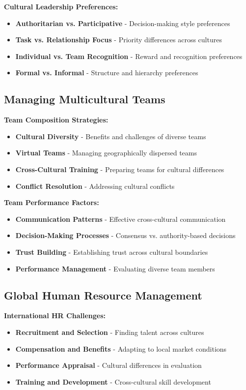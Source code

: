 \documentclass[12pt]{article}
\begin{document}
\textbf{Cultural Leadership Preferences:}
\begin{itemize}
    \item \textbf{Authoritarian vs. Participative} - Decision-making style preferences
    \item \textbf{Task vs. Relationship Focus} - Priority differences across cultures
    \item \textbf{Individual vs. Team Recognition} - Reward and recognition preferences
    \item \textbf{Formal vs. Informal} - Structure and hierarchy preferences
\end{itemize}

\subsection{Managing Multicultural Teams}

\textbf{Team Composition Strategies:}
\begin{itemize}
    \item \textbf{Cultural Diversity} - Benefits and challenges of diverse teams
    \item \textbf{Virtual Teams} - Managing geographically dispersed teams
    \item \textbf{Cross-Cultural Training} - Preparing teams for cultural differences
    \item \textbf{Conflict Resolution} - Addressing cultural conflicts
\end{itemize}

\textbf{Team Performance Factors:}
\begin{itemize}
    \item \textbf{Communication Patterns} - Effective cross-cultural communication
    \item \textbf{Decision-Making Processes} - Consensus vs. authority-based decisions
    \item \textbf{Trust Building} - Establishing trust across cultural boundaries
    \item \textbf{Performance Management} - Evaluating diverse team members
\end{itemize}

\subsection{Global Human Resource Management}

\textbf{International HR Challenges:}
\begin{itemize}
    \item \textbf{Recruitment and Selection} - Finding talent across cultures
    \item \textbf{Compensation and Benefits} - Adapting to local market conditions
    \item \textbf{Performance Appraisal} - Cultural differences in evaluation
    \item \textbf{Training and Development} - Cross-cultural skill development
\end{itemize}
\end{document}
